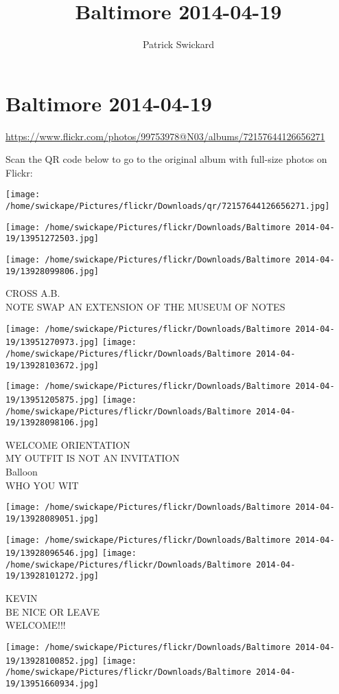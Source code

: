 \documentclass[10pt,letterpaper]{article}
\title{Baltimore 2014-04-19}
\author{Patrick Swickard}
\date{}
\begin{document}
\section*{Baltimore 2014-04-19}

\url{https://www.flickr.com/photos/99753978@N03/albums/72157644126656271}

Scan the QR code below to go to the original album with full-size photos on Flickr:

\texttt{[image: /home/swickape/Pictures/flickr/Downloads/qr/72157644126656271.jpg]}
\pagebreak

\texttt{[image: /home/swickape/Pictures/flickr/Downloads/Baltimore 2014-04-19/13951272503.jpg]}

\vspace{0.25in}
\texttt{[image: /home/swickape/Pictures/flickr/Downloads/Baltimore 2014-04-19/13928099806.jpg]}

CROSS A.B.\\
NOTE SWAP AN EXTENSION OF THE MUSEUM OF NOTES
\pagebreak

\texttt{[image: /home/swickape/Pictures/flickr/Downloads/Baltimore 2014-04-19/13951270973.jpg]}
\texttt{[image: /home/swickape/Pictures/flickr/Downloads/Baltimore 2014-04-19/13928103672.jpg]}

\texttt{[image: /home/swickape/Pictures/flickr/Downloads/Baltimore 2014-04-19/13951205875.jpg]}
\texttt{[image: /home/swickape/Pictures/flickr/Downloads/Baltimore 2014-04-19/13928098106.jpg]}

WELCOME ORIENTATION\\
MY OUTFIT IS NOT AN INVITATION\\
Balloon\\
WHO YOU WIT
\pagebreak

\texttt{[image: /home/swickape/Pictures/flickr/Downloads/Baltimore 2014-04-19/13928089051.jpg]}

\vspace{0.25in}
\texttt{[image: /home/swickape/Pictures/flickr/Downloads/Baltimore 2014-04-19/13928096546.jpg]}
\texttt{[image: /home/swickape/Pictures/flickr/Downloads/Baltimore 2014-04-19/13928101272.jpg]}

KEVIN\\
BE NICE OR LEAVE\\
WELCOME!!!
\pagebreak

\texttt{[image: /home/swickape/Pictures/flickr/Downloads/Baltimore 2014-04-19/13928100852.jpg]}
\texttt{[image: /home/swickape/Pictures/flickr/Downloads/Baltimore 2014-04-19/13951660934.jpg]}
\end{document}

